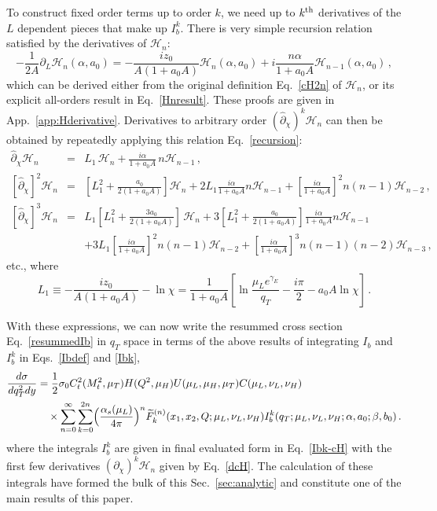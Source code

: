\documentclass[a4,letterpaper,11pt]{article}
\newcommand{\nn}{\nonumber}
\newcommand{\be}{\begin{equation}}
\newcommand{\ee}{\end{equation}}
\newcommand{\bea}{\begin{eqnarray}}
\newcommand{\eea}{\end{eqnarray}}
\newcommand{\as}{\alpha_s}
\newcommand{\cH}{\mathcal{H}}
\newcommand{\wt}{\widetilde}
\newcommand{\eq}[1]{Eq.~\eqref{#1}}
\newcommand{\eqs}[2]{Eqs.~\eqref{#1} and \eqref{#2}}
\renewcommand{\sec}[1]{Sec.~\ref{sec:#1}}
\newcommand{\appx}[1]{App.~\ref{app:#1}}
\begin{document}
To construct fixed order terms up to order $k$, we need up to $k^{\rm th}$ derivatives of the $L$ dependent pieces that make up $I_b^k$. 
There is very simple recursion relation satisfied by the derivatives of $\cH_n$:
\be
\label{recursion}
-\frac{1}{2A}\partial_L \mathcal{H}_{n}(\alpha,a_0) =  -\frac{i z_0}{A(1+a_0 A)} \cH_{n}(\alpha,a_0) + i\frac{n \alpha}{1+a_0 A} \mathcal{H}_{n-1}(\alpha,a_0)\,,
\ee
which can be derived either from the original definition \eq{cH2n} of $\cH_n$, or its explicit all-orders result in \eq{Hnresult}. These proofs are given in \appx{Hderivative}.
Derivatives to arbitrary order $(\hat\partial_\chi)^k\cH_n$ can then be obtained by repeatedly applying this relation \eq{recursion}:
\bea \label{dcH}
\hat \partial_{\chi}  \cH_n &=&  L_1\, \cH_{n}+ \frac{i \alpha}{1+a_0 A} \,n\cH_{n-1}
\,,\\
\left[ \hat \partial_{\chi} \right]^2  \cH_n  
&=& 
\left[L_1^2 +\frac{a_0}{2(1+a_0 A)} \right] \cH_n +2L_1\frac{i \alpha}{1+a_0 A}n \cH_{n-1} +\left[ \frac{i \alpha}{1+a_0 A} \right]^2 n(n-1) \cH_{n-2}
\,,\nn\\
\left[ \hat \partial_{\chi} \right]^3 \cH_n
 &=&L_1 \left[L_1^2 +\frac{3 a_0}{2(1+a_0 A)} \right]\, \cH_n 
	+ 3\left[L_1^2 +\frac{ a_0}{2(1+a_0 A)} \right] \frac{i \alpha}{1+a_0 A}n\cH_{n-1} 
\nn\\ &&
	+3 L_1 \left[ \frac{i \alpha}{1+a_0 A} \right]^2 n(n-1) \cH_{n-2}
	+\left[ \frac{i \alpha}{1+a_0 A} \right]^3 n(n-1)(n-2) \cH_{n-3}  
\,,\nn
\eea
etc., where
\be
L_1 \equiv -\frac{i z_0}{A(1+a_0 A)} - \ln\chi 
		=\frac{1}{1+a_0 A}\left[  \ln\frac{\mu_L e^{\gamma_E}}{q_T}-\frac{i\pi}{2}-a_0 A \ln\chi \right]
\,.
\ee

With these expressions, we can now write the resummed cross section \eq{resummedIb} in $q_T$ space in terms of the above results of integrating $I_b$ and $I_b^k$ in \eqs{Ibdef}{Ibk},
\begin{align}
\label{thefinalresult}
\frac{d\sigma}{dq_T^2 dy} &= \frac{1}{2}\sigma_0 C_t^2(M_t^2,\mu_T)H(Q^2,\mu_H) U(\mu_L,\mu_H, \mu_T) C(\mu_L,\nu_L,\nu_H) \\
&\quad\times \sum_{n=0}^\infty \sum_{k=0}^{2n} \Bigl(\frac{\as(\mu_L)}{4\pi}\Bigr)^n \wt F^{(n)}_k(x_1,x_2,Q;\mu_L,\nu_L,\nu_H)I_b^k(q_T;\mu_L,\nu_L,\nu_H;\alpha,a_0;\beta,b_0)\,. \nn
\end{align}
where the integrals $I_b^k$ are given in final evaluated form in \eq{Ibk-cH} with the first few derivatives $(\partial_\chi)^k \cH_n$ given by \eq{dcH}. The calculation of these integrals have formed the bulk of this \sec{analytic} and constitute one of the main results of this paper.
\end{document}
